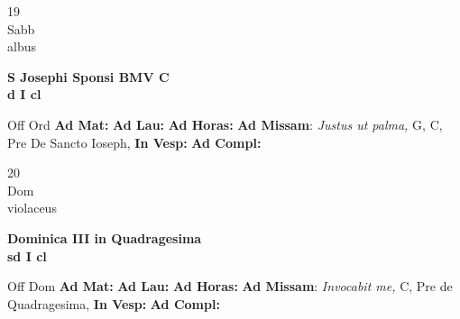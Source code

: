 \documentclass[10pt, openany]{book}
\begin{document}
        \begin{center}
            \begin{minipage}{3.5in}
                \vspace{2em}
                \begin{minipage}{0.5in}
                    {\Huge 19} \\
                    {\normalsize Sabb} \\
                    {\normalsize albus}
                \end{minipage}
                \begin{minipage}{3.0in}
                    \textbf{ \large S Josephi Sponsi BMV C \\
                    \textnormal{\normalsize d I cl}} \\ 
                \end{minipage}
                \begin{justify}Off Ord
                    \textbf{Ad Mat: }
                    \textbf{Ad Lau: }
                    \textbf{Ad Horas: }\textbf{Ad Missam}: \textit{Justus ut palma,} G, C, Pre De Sancto Ioseph,  
                    \textbf{In Vesp: }
                    \textbf{Ad Compl: }
                \end{justify}
            \end{minipage}
        \end{center}
    
        \begin{center}
            \begin{minipage}{3.5in}
                \vspace{2em}
                \begin{minipage}{0.5in}
                    {\Huge 20} \\
                    {\normalsize Dom} \\
                    {\normalsize violaceus}
                \end{minipage}
                \begin{minipage}{3.0in}
                    \textbf{ \large Dominica III in Quadragesima \\
                    \textnormal{\normalsize sd I cl}} \\ 
                \end{minipage}
                \begin{justify}Off Dom
                    \textbf{Ad Mat: }
                    \textbf{Ad Lau: }
                    \textbf{Ad Horas: }\textbf{Ad Missam}: \textit{Invocabit me,} C, Pre de Quadragesima,  
                    \textbf{In Vesp: }
                    \textbf{Ad Compl: }
                \end{justify}
            \end{minipage}
        \end{center}
    
\end{document}
